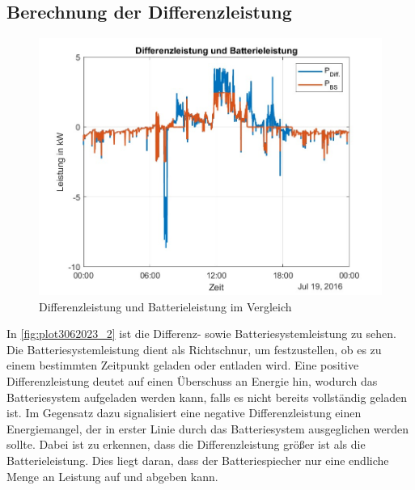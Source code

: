 \subsection{Berechnung der Differenzleistung}
\begin{figure}[H]
    \centering
    \includegraphics[width=\textwidth]{Abbildungen/plot_vorbereitungsfrage3.jpg}
    \caption{Differenzleistung und Batterieleistung im Vergleich}
    \label{fig:plot3062023_2}
\end{figure}
In \autoref{fig:plot3062023_2} ist die Differenz- sowie Batteriesystemleistung zu sehen. 
Die Batteriesystemleistung dient als Richtschnur, um festzustellen, ob es zu einem bestimmten Zeitpunkt geladen oder entladen wird. 
Eine positive Differenzleistung deutet auf einen Überschuss an Energie hin, wodurch das Batteriesystem aufgeladen werden kann, falls es nicht bereits vollständig geladen ist. Im Gegensatz dazu signalisiert eine negative Differenzleistung einen Energiemangel, der in erster Linie durch das Batteriesystem ausgeglichen werden sollte.
Dabei ist zu erkennen, dass die Differenzleistung größer ist als die Batterieleistung. 
Dies liegt daran, dass der Batteriespiecher nur eine endliche Menge an Leistung auf und abgeben kann.


